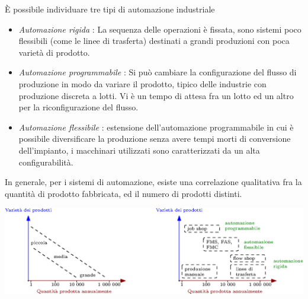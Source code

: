 \documentclass[10pt, letterpaper]{report}
\begin{document}
È possibile individuare tre tipi di automazione industriale\begin{itemize}
    \item \textit{Automazione rigida} : La sequenza delle operazioni è fissata, sono sistemi poco 
     flessibili (come le linee di trasferta) destinati a grandi produzioni con poca varietà di prodotto.
    \item \textit{Automazione programmabile} : Si può cambiare la configurazione del flusso di produzione in modo 
    da variare il prodotto, tipico delle industrie con produzione discreta a lotti. Vi è un tempo di attesa 
    fra un lotto ed un altro per la riconfigurazione del flusso.
    \item \textit{Automazione flessibile} : estensione dell'automazione programmabile in 
    cui è possibile diversificare la produzione senza avere tempi morti di 
    conversione dell'impianto,  i macchinari utilizzati sono caratterizzati da un alta configurabilità.
\end{itemize}
In generale, per i sistemi di automazione, esiste una correlazione qualitativa fra la quantità di prodotto fabbricata, ed il 
numero di prodotti distinti.\begin{center}
    \includegraphics[width=1\textwidth ]{images/quantitVarieta.eps}
\end{center}\flowerLine 
\end{document}
